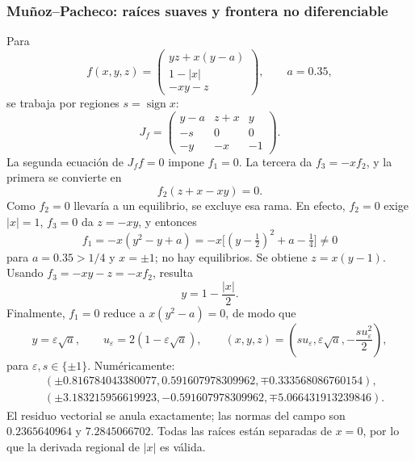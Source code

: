 \subsubsection{Muñoz--Pacheco: raíces suaves y frontera no diferenciable}

Para
\begin{equation}
 f(x,y,z)=
 \begin{pmatrix}
 yz+x(y-a)\\1-|x|\\-xy-z
 \end{pmatrix},\qquad a=0.35,
 \label{eq:pp-munoz-field}
\end{equation}
se trabaja por regiones \(s=\operatorname{sign}x\):
\begin{equation}
 J_f=
 \begin{pmatrix}
 y-a&z+x&y\\-s&0&0\\-y&-x&-1
 \end{pmatrix}.
 \label{eq:pp-munoz-jacobian}
\end{equation}
La segunda ecuación de \(J_f f=0\) impone \(f_1=0\). La tercera da
\(f_3=-xf_2\), y la primera se convierte en
\begin{equation}
 f_2(z+x-xy)=0.
\end{equation}
Como \(f_2=0\) llevaría a un equilibrio, se excluye esa rama. En efecto,
\(f_2=0\) exige \(|x|=1\), \(f_3=0\) da \(z=-xy\), y entonces
\[
 f_1=-x(y^2-y+a)
 =-x\bigl[(y-\tfrac12)^2+a-\tfrac14\bigr]\ne0
\]
para $a=0.35>1/4$ y $x=\pm1$; no hay equilibrios. Se obtiene
\(z=x(y-1)\). Usando
\(f_3=-xy-z=-xf_2\), resulta
\begin{equation}
 y=1-\frac{|x|}{2}.
\end{equation}
Finalmente, \(f_1=0\) reduce a \(x(y^2-a)=0\), de modo que
\begin{equation}
 y=\varepsilon\sqrt a,\qquad
 u_\varepsilon=2(1-\varepsilon\sqrt a),\qquad
 (x,y,z)=
 \left(su_\varepsilon,\varepsilon\sqrt a,
 -\frac{s u_\varepsilon^2}{2}\right),
 \label{eq:pp-munoz-closed}
\end{equation}
para \(\varepsilon,s\in\{\pm1\}\). Numéricamente:
\begin{align}
 &(\pm0.816784043380077, 0.591607978309962,
 \mp0.333568086760154),\\
 &(\pm3.183215956619923, -0.591607978309962,
 \mp5.066431913239846).
\end{align}
El residuo vectorial se anula exactamente; las normas del campo son
\(0.2365640964\) y \(7.2845066702\). Todas las raíces están separadas de
\(x=0\), por lo que la derivada regional de \(|x|\) es válida.

